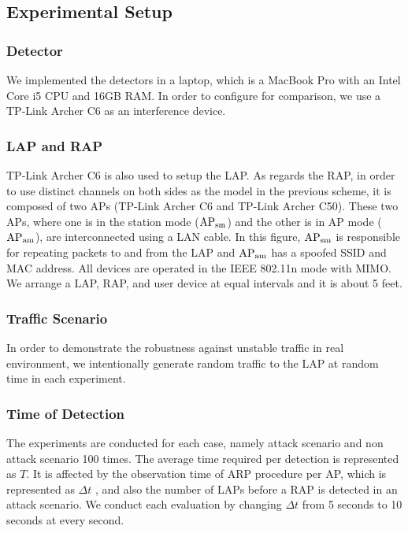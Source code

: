 \documentclass[conference]{IEEEtran}
\begin{document}
\subsection{Experimental Setup}
\subsubsection{Detector}
We implemented the detectors in a laptop, which is a MacBook Pro with an Intel Core i5 CPU and 16GB RAM.
In order to configure \cite{previous} for comparison, we use a TP-Link Archer C6 as an interference device.

\subsubsection{LAP and RAP}
TP-Link Archer C6 is also used to setup the LAP.
As regards the RAP, in order to use distinct channels on both sides as the model in the previous scheme, it is composed of two APs (TP-Link Archer C6 and TP-Link Archer C50).
These two APs, where one is in the station mode ($\rm AP_{sm}$) and the other is in AP mode ($\rm AP_{am}$), are interconnected using a LAN cable.
In this figure, $\rm AP_{sm}$ is responsible for repeating packets to and from the LAP and $\rm AP_{am}$ has a spoofed SSID and MAC address.
All devices are operated in the IEEE 802.11n mode with MIMO.
We arrange a LAP, RAP, and user device at equal intervals and it is about 5 feet.

\subsubsection{Traffic Scenario}
In order to demonstrate the robustness against unstable traffic in real environment, we intentionally generate random traffic to the LAP at random time in each experiment.

\subsubsection{Time of Detection}
The experiments are conducted for each case, namely attack scenario and non attack scenario 100 times.
The average time required per detection is represented as $T$.
It is affected by the observation time of ARP procedure per AP, which is represented as $\Delta t$ , and also the number of LAPs before a RAP is detected in an attack scenario.
We conduct each evaluation by changing $\Delta t$ from 5 seconds to 10 seconds at every second.
\end{document}
